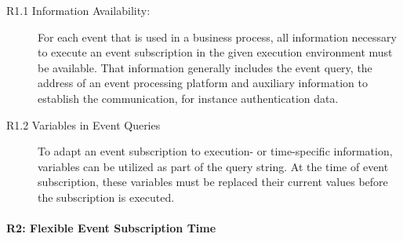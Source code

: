\begin{description}
	\item[R1.1 Information Availability:]
	For each event that is used in a business process, all information necessary to execute an event subscription in the given execution environment must be available.
	That information generally includes the event query, the address of an event processing platform and auxiliary information to establish the communication, for instance authentication data.
	\item[R1.2 Variables in Event Queries] 
	To adapt an event subscription to execution- or time-specific information, variables can be utilized as part of the query string.
	At the time of event subscription, these variables must be replaced their current values before the subscription is executed.
\end{description}

\paragraph{R2: Flexible Event Subscription Time}

